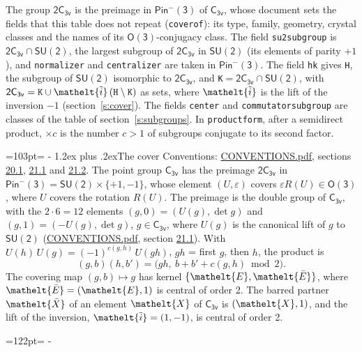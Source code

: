 \documentclass[10pt,a4paper]{article}
\makeatletter
\renewcommand\section{\@startsection{section}{1}{\z@}{-3ex plus -1ex minus -.2ex}%
  {1.2ex plus .2ex}{\normalfont\large\sffamily\bfseries\color{parttitle}}}
\newcommand{\needspace}[1]{\par\penalty-100\begingroup\dimen0=#1\relax\dimen2=\pagegoal
  \advance\dimen2-\pagetotal\ifdim\dimen0>\dimen2\relax\ifdim\dimen2>0pt\vfil\break\fi\fi
  \endgroup}
\numberwithin{equation}{section}
\newcommand{\eltfont}[1]{{\let\sigma\eltsigma\mathelt{#1}}}
\newcommand{\grp}[1]{\mathsf{#1}}
\newcommand{\elt}[1]{\eltfont{#1}}
\newcommand{\dirprod}{\times}
\newcommand{\barred}[1]{\bar{#1}}
\newcommand{\lift}[1]{\tilde{#1}}
\makeatother
\begin{document}
\leavevmode\label{n:element.inversion}\label{n:group.preimage}The group $\grp{2C_{3v}}$ is the preimage in $\grp{Pin^{-}(3)}$ of \href{../../../rotation/data/pdf/C3v.pdf}{$\grp{C_{3v}}$}, whose document sets the fields that this table does not repeat (\texttt{coverof}): its type, family, geometry, crystal classes and the names of its \href{../../../rotation/data/pdf/O3.pdf}{$\grp{O(3)}$}-conjugacy class. The field \texttt{su2subgroup} is $\grp{2C_{3v}} \cap \grp{SU(2)}$, the largest subgroup of $\grp{2C_{3v}}$ in $\grp{SU(2)}$ (its elements of parity $+1$), and \texttt{normalizer} and \texttt{centralizer} are taken in $\grp{Pin^{-}(3)}$. The field \texttt{hk} gives \texttt{H}, the subgroup of $\grp{SU(2)}$ isomorphic to $\grp{2C_{3v}}$, and \texttt{K}${} = \grp{2C_{3v}} \cap \grp{SU(2)}$, with $\grp{2C_{3v}} = \texttt{K} \cup \elt{\lift{i}}\,(\texttt{H} \setminus \texttt{K})$ as sets, where $\elt{\lift{i}}$ is the lift of the inversion $-1$ (section~\ref{s:cover}). The fields \texttt{center} and \texttt{commutatorsubgroup} are classes of the table of section~\ref{s:subgroups}.
\leavevmode\label{n:index.conjugates.c}In \texttt{productform}, after a semidirect product, ${\times}c$ is the number $c > 1$ of subgroups conjugate to its second factor.
\needspace{103pt}
\section{The cover}\label{s:cover}
Conventions: \href{../../CONVENTIONS.pdf}{CONVENTIONS.pdf}, sections \href{../../CONVENTIONS.pdf\#conv.20.1}{20.1}, \href{../../CONVENTIONS.pdf\#conv.21.1}{21.1} and \href{../../CONVENTIONS.pdf\#conv.21.2}{21.2}.
\leavevmode\label{n:group.pin.minus}\label{n:group.su2}\label{n:local.pin.sign}\label{n:matrix.covered}\label{n:matrix.lift.su2}\label{n:index.bar}The point group $\grp{C_{3v}}$ has the preimage $\grp{2C_{3v}}$ in $\grp{Pin^{-}(3)} = \grp{SU(2)} \dirprod \{+1, -1\}$, whose element $(U, \varepsilon)$ covers $\varepsilon R(U) \in \grp{O(3)}$, where $U$ covers the rotation $R(U)$. The preimage is the double group of $\grp{C_{3v}}$, with the $2 \cdot 6 = 12$ elements $(g, 0) = (U(g), \det g)$ and $(g, 1) = (-U(g), \det g)$, $g \in \grp{C_{3v}}$, where $U(g)$ is the canonical lift of $g$ to $\grp{SU(2)}$ (\href{../../CONVENTIONS.pdf}{CONVENTIONS.pdf}, section \href{../../CONVENTIONS.pdf\#conv.21.1}{21.1}). \label{n:function.cocycle}With $U(h)\,U(g) = (-1)^{c(g,h)}\,U(gh)$, $gh$ = first $g$, then $h$, the product is
\begin{equation}\label{e:product}(g, b)(h, b') = \bigl(gh,\ b + b' + c(g, h) \bmod 2\bigr).\end{equation}
\leavevmode\label{n:mark.bar}The covering map $(g, b) \mapsto g$ has kernel $\{\elt{E}, \elt{\barred{E}}\}$, where $\elt{\barred{E}} = (\elt{E}, 1)$ is central of order 2. \label{n:element.named}\label{n:mark.lift}The barred partner $\elt{\barred{X}}$ of an element $\elt{X}$ of $\grp{C_{3v}}$ is $(\elt{X}, 1)$, and the lift of the inversion, $\elt{\lift{i}} = (1, -1)$, is central of order 2.
\needspace{122pt}
\end{document}
